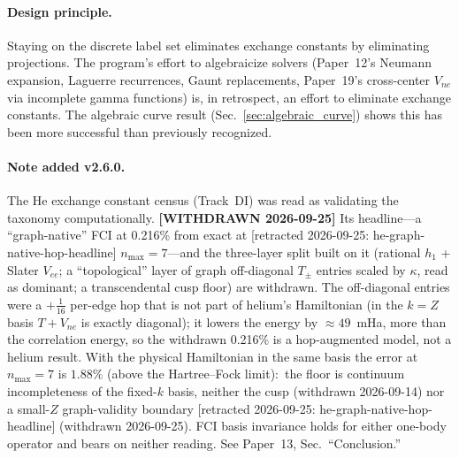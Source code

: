 \documentclass[aps,pra,twocolumn,superscriptaddress,longbibliography]{revtex4-2}
\newcommand{\gvq}[2]{#2}%
\begin{document}
\paragraph{Design principle.}
Staying on the discrete label set eliminates exchange constants by
eliminating projections.  The program's effort to algebraicize solvers (Paper~12's
Neumann expansion, Laguerre recurrences, Gaunt replacements,
Paper~19's cross-center $V_{ne}$ via incomplete gamma functions) is,
in retrospect, an effort to eliminate exchange constants.  The algebraic
curve result (Sec.~\ref{sec:algebraic_curve}) shows this has been more
successful than previously recognized.

\paragraph{Note added v2.6.0.}
The He exchange constant census (Track~DI) was read as validating the
taxonomy computationally.  \textbf{[WITHDRAWN 2026-09-25]} Its
headline---a ``graph-native'' FCI at 0.216\% from exact at [retracted 2026-09-25: he-graph-native-hop-headline]
$n_{\max} = 7$---and the three-layer split built on it (rational
$h_1$ + Slater $V_{ee}$; a ``topological'' layer of graph off-diagonal
$T_\pm$ entries scaled by $\kappa$, read as dominant; a transcendental
cusp floor) are withdrawn.  The off-diagonal entries were a
$+\tfrac{1}{16}$ per-edge hop that is not part of helium's Hamiltonian
(in the $k = Z$ basis $T + V_{ne}$ is exactly diagonal); it lowers the
energy by $\approx 49$~mHa, more than the correlation energy, so the
withdrawn 0.216\% is a hop-augmented model, not a helium result.  With the
physical Hamiltonian in the same basis the error at $n_{\max} = 7$ is
$\gvq{he_gn_phys_n7_pct}{1.88}\%$ (above the Hartree--Fock limit):\ the
floor is continuum incompleteness of the fixed-$k$ basis, neither the
cusp (withdrawn 2026-09-14) nor a small-$Z$ graph-validity boundary [retracted 2026-09-25: he-graph-native-hop-headline]
(withdrawn 2026-09-25).  FCI basis invariance holds for either one-body
operator and bears on neither reading.  See Paper~13, Sec.\ ``Conclusion.''
\end{document}
